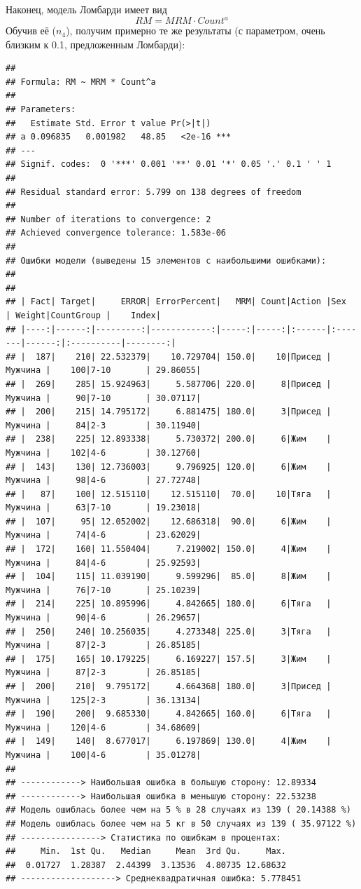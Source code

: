 \documentclass[
]{article}
\begin{document}
Наконец, модель Ломбарди имеет вид \[RM=MRM \cdot Count^a\] Обучив её
(\(n_4\)), получим примерно те же результаты (с параметром, очень
близким к 0.1, предложенным Ломбарди):

\begin{verbatim}
## 
## Formula: RM ~ MRM * Count^a
## 
## Parameters:
##   Estimate Std. Error t value Pr(>|t|)    
## a 0.096835   0.001982   48.85   <2e-16 ***
## ---
## Signif. codes:  0 '***' 0.001 '**' 0.01 '*' 0.05 '.' 0.1 ' ' 1
## 
## Residual standard error: 5.799 on 138 degrees of freedom
## 
## Number of iterations to convergence: 2 
## Achieved convergence tolerance: 1.583e-06
## 
## Ошибки модели (выведены 15 элементов с наибольшими ошибками): 
## 
## 
## | Fact| Target|     ERROR| ErrorPercent|   MRM| Count|Action |Sex     | Weight|CountGroup |    Index|
## |----:|------:|---------:|------------:|-----:|-----:|:------|:-------|------:|:----------|--------:|
## |  187|    210| 22.532379|    10.729704| 150.0|    10|Присед |Мужчина |    100|7-10       | 29.86055|
## |  269|    285| 15.924963|     5.587706| 220.0|     8|Присед |Мужчина |     90|7-10       | 30.07117|
## |  200|    215| 14.795172|     6.881475| 180.0|     3|Присед |Мужчина |     84|2-3        | 30.11940|
## |  238|    225| 12.893338|     5.730372| 200.0|     6|Жим    |Мужчина |    102|4-6        | 30.12760|
## |  143|    130| 12.736003|     9.796925| 120.0|     6|Жим    |Мужчина |     98|4-6        | 27.72748|
## |   87|    100| 12.515110|    12.515110|  70.0|    10|Тяга   |Мужчина |     63|7-10       | 19.23018|
## |  107|     95| 12.052002|    12.686318|  90.0|     6|Жим    |Мужчина |     74|4-6        | 23.62029|
## |  172|    160| 11.550404|     7.219002| 150.0|     4|Жим    |Мужчина |     84|4-6        | 25.92593|
## |  104|    115| 11.039190|     9.599296|  85.0|     8|Жим    |Мужчина |     76|7-10       | 25.10239|
## |  214|    225| 10.895996|     4.842665| 180.0|     6|Тяга   |Мужчина |     90|4-6        | 26.29657|
## |  250|    240| 10.256035|     4.273348| 225.0|     3|Тяга   |Мужчина |     87|2-3        | 26.85185|
## |  175|    165| 10.179225|     6.169227| 157.5|     3|Жим    |Мужчина |     87|2-3        | 26.85185|
## |  200|    210|  9.795172|     4.664368| 180.0|     3|Присед |Мужчина |    125|2-3        | 36.13134|
## |  190|    200|  9.685330|     4.842665| 160.0|     6|Тяга   |Мужчина |    120|4-6        | 34.68609|
## |  149|    140|  8.677017|     6.197869| 130.0|     4|Жим    |Мужчина |    100|4-6        | 35.01278|
## 
## ------------> Наибольшая ошибка в большую сторону: 12.89334 
## ------------> Наибольшая ошибка в меньшую сторону: 22.53238 
## Модель ошиблась более чем на 5 % в 28 случаях из 139 ( 20.14388 %)
## Модель ошиблась более чем на 5 кг в 50 случаях из 139 ( 35.97122 %)
## ----------------> Статистика по ошибкам в процентах:
##     Min.  1st Qu.   Median     Mean  3rd Qu.     Max. 
##  0.01727  1.28387  2.44399  3.13536  4.80735 12.68632 
## -------------------> Среднеквадратичная ошибка: 5.778451
\end{verbatim}
\end{document}
